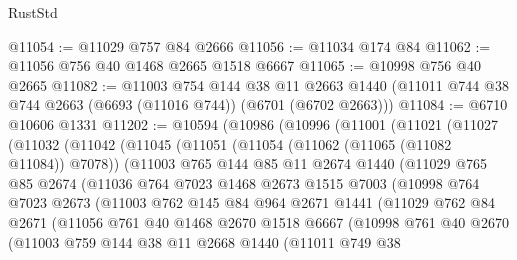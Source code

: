 \begin{lexlean}{RustStd}
\begin{coremodule}
@11054 := @11029 @757 @84 @2666
@11056 := @11034 @174 @84
@11062 := @11056 @756 @40 @1468 @2665 @1518 @6667
@11065 := @10998 @756 @40 @2665
@11082 := @11003
    @754
    @144
    @38
    @11
    @2663
    @1440
    (@11011 @744 @38 @744 @2663 (@6693 (@11016 @744)) (@6701 (@6702 @2663)))
@11084 := @6710 @10606 @1331
@11202 := @10594
    (@10986
      (@10996
        (@11001
          (@11021
            (@11027
              (@11032
                (@11042
                  (@11045
                    (@11051
                      (@11054 (@11062 (@11065 (@11082 @11084)) @7078))
                      (@11003
                        @765
                        @144
                        @85
                        @11
                        @2674
                        @1440
                        (@11029
                          @765
                          @85
                          @2674
                          (@11036
                            @764
                            @7023
                            @1468
                            @2673
                            @1515
                            @7003
                            (@10998
                              @764
                              @7023
                              @2673
                              (@11003
                                @762
                                @145
                                @84
                                @964
                                @2671
                                @1441
                                (@11029
                                  @762
                                  @84
                                  @2671
                                  (@11056
                                    @761
                                    @40
                                    @1468
                                    @2670
                                    @1518
                                    @6667
                                    (@10998
                                      @761
                                      @40
                                      @2670
                                      (@11003
                                        @759
                                        @144
                                        @38
                                        @11
                                        @2668
                                        @1440
                                        (@11011
                                          @749
                                          @38

\end{coremodule}
\end{lexlean}
